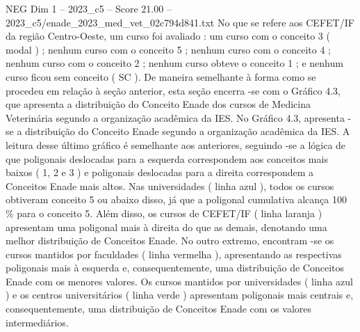 \begin{textsample}{NEG Dim 1 – 2023\_c5 – Score 21.00 – 2023\_c5/enade\_2023\_med\_vet\_02c794d841.txt}
No que se refere aos CEFET/IF da região Centro-Oeste, um curso foi avaliado : um curso com o conceito 3 ( modal ) ; nenhum curso com o conceito 5 ; nenhum curso com o conceito 4 ; nenhum curso com o conceito 2 ; nenhum curso obteve o conceito 1 ; e nenhum curso ficou sem conceito ( SC ).
De maneira semelhante à forma como se procedeu em relação à seção anterior, esta seção encerra -se com o Gráfico 4.3, que apresenta a distribuição do Conceito Enade dos cursos de Medicina Veterinária segundo a organização acadêmica da IES.
No Gráfico 4.3, apresenta -se a distribuição do Conceito Enade segundo a organização acadêmica da IES.
A leitura desse último gráfico é semelhante aos anteriores, seguindo -se a lógica de que poligonais deslocadas para a esquerda correspondem aos conceitos mais baixos ( 1, 2 e 3 ) e poligonais deslocadas para a direita correspondem a Conceitos Enade mais altos.
Nas universidades ( linha azul ), todos os cursos obtiveram conceito 5 ou abaixo disso, já que a poligonal cumulativa alcança 100 \% para o conceito 5.
Além disso, os cursos de CEFET/IF ( linha laranja ) apresentam uma poligonal mais à direita do que as demais, denotando uma melhor distribuição de Conceitos Enade.
No outro extremo, encontram -se os cursos mantidos por faculdades ( linha vermelha ), apresentando as respectivas poligonais mais à esquerda e, consequentemente, uma distribuição de Conceitos Enade com os menores valores.
Os cursos mantidos por universidades ( linha azul ) e os centros universitários ( linha verde ) apresentam poligonais mais centrais e, consequentemente, uma distribuição de Conceitos Enade com os valores intermediários.

\end{textsample}
